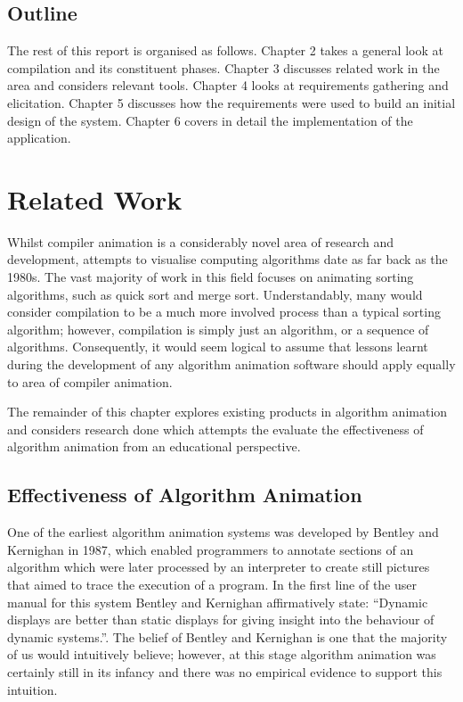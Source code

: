 \documentclass{l4proj}
\begin{document}
\section{Outline}
The rest of this report is organised as follows. Chapter 2 takes a general look at compilation and its constituent phases. Chapter 3 discusses related work in the area and considers relevant tools. Chapter 4 looks at requirements gathering and elicitation. Chapter 5 discusses how the requirements were used to build an initial design of the system. Chapter 6 covers in detail the implementation of the application.

\chapter{Related Work}
Whilst compiler animation is a considerably novel area of research and development, attempts to visualise computing algorithms date as far back as the 1980s\cite{BentleyKernighan}. The vast majority of work in this field focuses on animating sorting algorithms, such as quick sort and merge sort. Understandably, many would consider compilation to be a much more involved process than a typical sorting algorithm; however, compilation is simply just an algorithm, or a sequence of algorithms. Consequently, it would seem logical to assume that lessons learnt during the development of any algorithm animation software should apply equally to area of compiler animation. 

The remainder of this chapter explores existing products in algorithm animation and considers research done which attempts the evaluate the effectiveness of algorithm animation from an educational perspective. 

\section{Effectiveness of Algorithm Animation}
One of the earliest algorithm animation systems was developed by Bentley and Kernighan in 1987\cite{BentleyKernighan}, which enabled programmers to annotate sections of an algorithm which were later processed by an interpreter to create still pictures that aimed to trace the execution of a program. In the first line of the user manual for this system Bentley and Kernighan affirmatively state: ``Dynamic displays are better than static displays for giving insight into the behaviour of dynamic systems.''. The belief of Bentley and Kernighan is one that the majority of us would intuitively believe; however, at this stage algorithm animation was certainly still in its infancy and there was no empirical evidence to support this intuition. 
\end{document}
